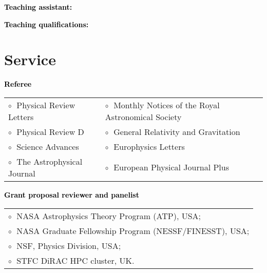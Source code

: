 \documentclass[a4paper]{moderncv}
\begin{document}
\vspace{0.2cm}
\textbf{\textcolor{black}{Teaching assistant:}}\vspace{0.05cm}\\
 \vspace{-0.1cm}

\vspace{0.2cm}
\textbf{\textcolor{black}{Teaching qualifications:}}\vspace{0.05cm}\\

\section{Service}

\textbf{\textcolor{black}{Referee}}\vspace{0.1cm}\\
\begin{tabular}{@{\hskip 0.4cm}l@{\hskip 0.4in}l}
$\circ\;$ Physical Review Letters & $\circ\;$ Monthly Notices of the Royal Astronomical Society \\
$\circ\;$ Physical Review D & $\circ\;$ General Relativity and Gravitation \\
$\circ\;$ Science Advances & $\circ\;$ Europhysics Letters \\
$\circ\;$ The Astrophysical Journal &  $\circ\;$ European Physical Journal Plus
\end{tabular}
\vspace{+0.15cm}
 
 \textbf{\textcolor{black}{Grant proposal reviewer and panelist}}\vspace{0.1cm}\\
\begin{tabular}{@{\hskip 0.4cm}l}
$\circ\;$ NASA Astrophysics Theory Program (ATP), USA; \\
$\circ\;$ NASA Graduate Fellowship Program (NESSF/FINESST), USA; \\
$\circ\;$ NSF, Physics Division, USA; \\
$\circ\;$ STFC DiRAC HPC cluster, UK.
\end{tabular}
\vspace{+0.15cm}
\end{document}
